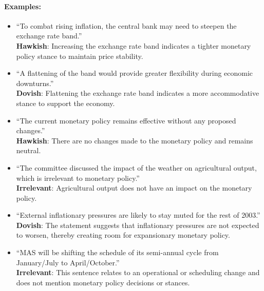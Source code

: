 \paragraph{Examples: }
\begin{itemize}
    \item ``To combat rising inflation, the central bank may need to steepen the exchange rate band.''\\
    \textbf{Hawkish}: Increasing the exchange rate band indicates a tighter monetary policy stance to maintain price stability.
    
    \item ``A flattening of the band would provide greater flexibility during economic downturns.''\\
    \textbf{Dovish}: Flattening the exchange rate band indicates a more accommodative stance to support the economy.

    \item ``The current monetary policy remains effective without any proposed changes.''\\
    \textbf{Hawkish}: There are no changes made to the monetary policy and remains neutral.
    
    \item ``The committee discussed the impact of the weather on agricultural output, which is irrelevant to monetary policy.''\\
    \textbf{Irrelevant}: Agricultural output does not have an impact on the monetary policy.
    
    \item ``External inflationary pressures are likely to stay muted for the rest of 2003.''\\
    \textbf{Dovish}: The statement suggests that inflationary pressures are not expected to worsen, thereby creating room for expansionary monetary policy.

    \item ``MAS will be shifting the schedule of its semi-annual cycle from January/July to April/October.''\\
    \textbf{Irrelevant}: This sentence relates to an operational or scheduling change and does not mention monetary policy decisions or stances.
    

\end{itemize}

\newpage


